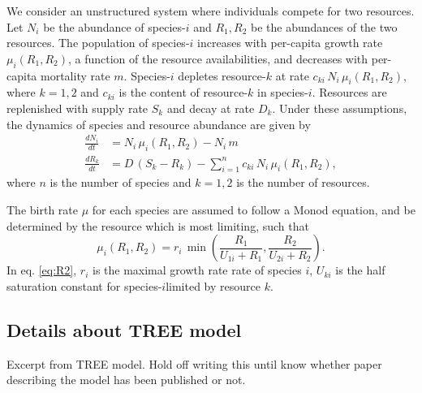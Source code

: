 \documentclass[a4paper,11pt]{article}
\begin{document}
We consider an unstructured system where individuals compete for two
resources. Let $N_i$ be the abundance of species-$i$ and $R_1, R_2$ be the
abundances of the two resources. The population of species-$i$ increases with
per-capita
growth rate $\mu_i(R_1,R_2)$, a function of the resource availabilities, and
decreases with per-capita mortality rate $m$. Species-$i$ depletes resource-$k$
at rate $c_{ki} \,  N_i \, \mu_i(R_1,R_2)$, where $k = 1, 2$ and $c_{ki}$ is
the content of resource-$k$ in species-$i$. Resources
are replenished
with supply rate $S_k$ and decay at rate $D_k$. Under these assumptions, the
dynamics of species and resource abundance are given by
\begin{subequations}
  \begin{align}
\label{eq:R1}
\frac{dN_i}{dt} &= N_i \, \mu_i(R_1,R_2) - N_i \, m \\
\frac{dR_k}{dt} &= D \, (S_k- R_k) - \sum_{i=1}^{n}{c_{ki} \, N_i \,
  \mu_i(R_1, R_2)},
\end{align}
\end{subequations}
where $n$ is the number of species and $k=1,2$ is the number of resources.

The birth rate $\mu$ for each species are assumed to follow a Monod equation,
and be determined by the resource which is most limiting, such that
\begin{equation}
\label{eq:R2}
\mu_i(R_1, R_2) = r_i \, \min \left(\frac{R_1}{U_{1i} + R_1},
                                    \frac{R_2}{U_{2i} + R_2} \right).
\end{equation}
In eq. \ref{eq:R2}, $r_i$ is the maximal growth rate rate of species $i$, $U_
{ki}$ is the half saturation constant for species-$i$limited by resource $k$.

\subsection{Details about TREE model}\label{TREE}

Excerpt from  TREE model. Hold off writing this until know whether paper describing
the model has been published or not.
\end{document}
